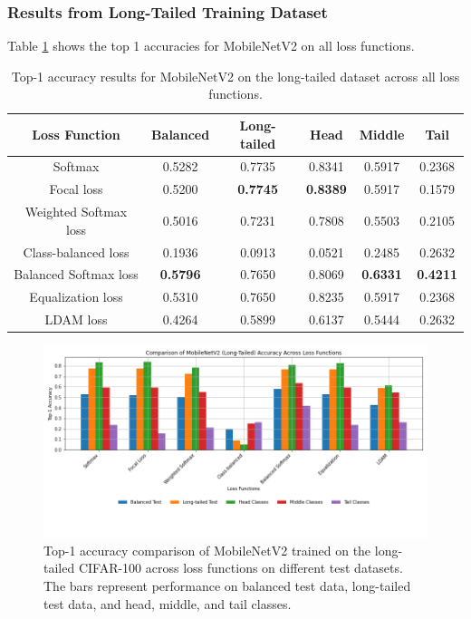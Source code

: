 \subsubsection{Results from Long-Tailed Training Dataset}

Table \ref{tab:mobilenet_lt_acc1_1} shows the top 1 accuracies for MobileNetV2 on all loss functions.

\begin{table}[H]
    \centering
    \caption{Top-1 accuracy results for MobileNetV2 on the long-tailed dataset across all loss functions.}
    \begin{tabular}{cccccc}
        \toprule
        Loss Function & Balanced & Long-tailed & Head & Middle & Tail \\ 
        \midrule
        Softmax   & 0.5282   & 0.7735 & 0.8341 & 0.5917 & 0.2368 \\
        Focal loss   & 0.5200   & \textbf{0.7745} & \textbf{0.8389} & 0.5917 & 0.1579 \\
        Weighted Softmax loss   & 0.5016   & 0.7231 & 0.7808 & 0.5503 & 0.2105 \\
        Class-balanced loss   & 0.1936   & 0.0913 & 0.0521 & 0.2485 & 0.2632 \\
        Balanced Softmax loss   & \textbf{0.5796}   & 0.7650 & 0.8069 & \textbf{0.6331} & \textbf{0.4211} \\
        Equalization loss   & 0.5310   & 0.7650 & 0.8235 & 0.5917 & 0.2368 \\
        LDAM loss   & 0.4264 & 0.5899 & 0.6137 & 0.5444 & 0.2632 \\
        \bottomrule
    \end{tabular}
    \label{tab:mobilenet_lt_acc1_1}
\end{table}

\begin{figure}[h!]
    \centering
    \includegraphics[width=\textwidth]{Images/Plots/mobilenet_lt_loss_comparison.png}
    \caption{Top-1 accuracy comparison of MobileNetV2 trained on the long-tailed CIFAR-100 across loss functions on different test datasets. The bars represent performance on balanced test data, long-tailed test data, and head, middle, and tail classes.}
    \label{fig:mobilenet_lt_loss_comparison}
\end{figure}

